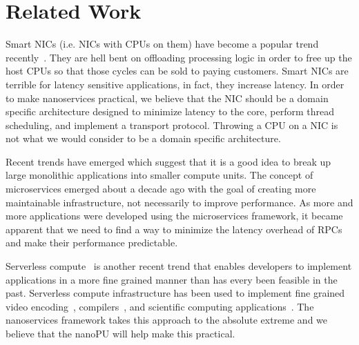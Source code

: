 \section{Related Work}
Smart NICs (i.e. NICs with CPUs on them) have become a popular trend recently~\cite{nitro, bluefield, pensando}.
They are hell bent on offloading processing logic in order to free up the host CPUs so that those cycles can be sold to paying customers.
Smart NICs are terrible for latency sensitive applications, in fact, they increase latency.
In order to make nanoservices practical, we believe that the NIC should be a domain specific architecture designed to minimize latency to the core, perform thread scheduling, and implement a transport protocol.
Throwing a CPU on a NIC is not what we would consider to be a domain specific architecture.

Recent trends have emerged which suggest that it is a good idea to break up large monolithic applications into smaller compute units.
The concept of microservices emerged about a decade ago with the goal of creating more maintainable infrastructure, not necessarily to improve performance.
As more and more applications were developed using the microservices framework, it became apparent that we need to find a way to minimize the latency overhead of RPCs and make their performance predictable.

Serverless compute~\cite{aws-lambda, gcloud-functions, azure-functions} is another recent trend that enables developers to implement applications in a more fine grained manner than has every been feasible in the past.
Serverless compute infrastructure has been used to implement fine grained video encoding~\cite{ExCamera}, compilers~\cite{gg}, and scientific computing applications~\cite{PyWren}.
The nanoservices framework takes this approach to the absolute extreme and we believe that the nanoPU will help make this practical.


